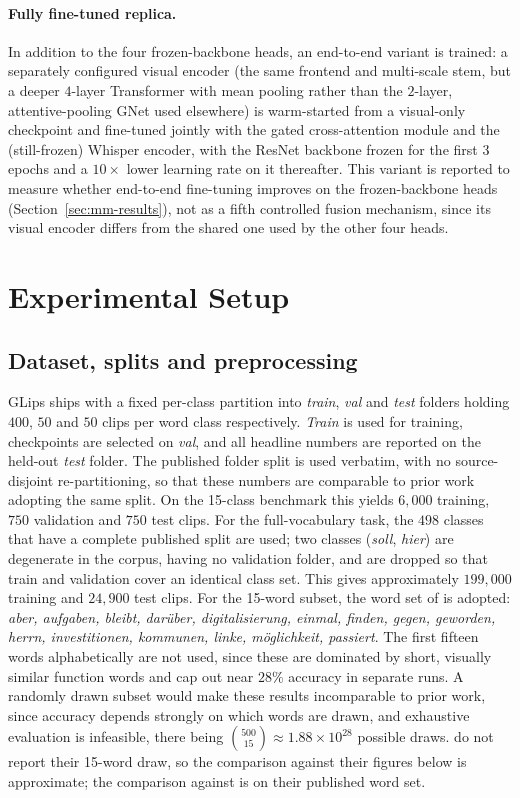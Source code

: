 \documentclass[10pt, a4paper]{article}
\begin{document}
\paragraph{Fully fine-tuned replica.} In addition to the four frozen-backbone heads, an end-to-end variant is trained: a separately configured visual encoder (the same frontend and multi-scale stem, but a deeper $4$-layer Transformer with mean pooling rather than the $2$-layer, attentive-pooling GNet used elsewhere) is warm-started from a visual-only checkpoint and fine-tuned jointly with the gated cross-attention module and the (still-frozen) Whisper encoder, with the ResNet backbone frozen for the first $3$ epochs and a $10\times$ lower learning rate on it thereafter. This variant is reported to measure whether end-to-end fine-tuning improves on the frozen-backbone heads (Section~\ref{sec:mm-results}), not as a fifth controlled fusion mechanism, since its visual encoder differs from the shared one used by the other four heads.
\section{Experimental Setup}
\subsection{Dataset, splits and preprocessing}
\label{sec:pre}
\noindent GLips \citep{schwiebert2022glips} ships with a fixed per-class partition into \emph{train}, \emph{val} and \emph{test} folders holding $400$, $50$ and $50$ clips per word class respectively. \emph{Train} is used for training, checkpoints are selected on \emph{val}, and all headline numbers are reported on the held-out \emph{test} folder. The published folder split is used verbatim, with no source-disjoint re-partitioning, so that these numbers are comparable to prior work adopting the same split. On the 15-class benchmark this yields $6{,}000$ training, $750$ validation and $750$ test clips. For the full-vocabulary task, the $498$ classes that have a complete published split are used; two classes (\emph{soll}, \emph{hier}) are degenerate in the corpus, having no validation folder, and are dropped so that train and validation cover an identical class set. This gives approximately $199{,}000$ training and $24{,}900$ test clips.
\noindent For the 15-word subset, the word set of \citet{ameer2024} is adopted: \emph{aber, aufgaben, bleibt, darüber, digitalisierung, einmal, finden, gegen, geworden, herrn, investitionen, kommunen, linke, möglichkeit, passiert}. The first fifteen words alphabetically are not used, since these are dominated by short, visually similar function words and cap out near $28\%$ accuracy in separate runs. A randomly drawn subset would make these results incomparable to prior work, since accuracy depends strongly on which words are drawn, and exhaustive evaluation is infeasible, there being $\binom{500}{15} \approx 1.88 \times 10^{28}$ possible draws. \citet{schwiebert2022glips} do not report their 15-word draw, so the comparison against their figures below is approximate; the comparison against \citet{ameer2024} is on their published word set.
\end{document}
